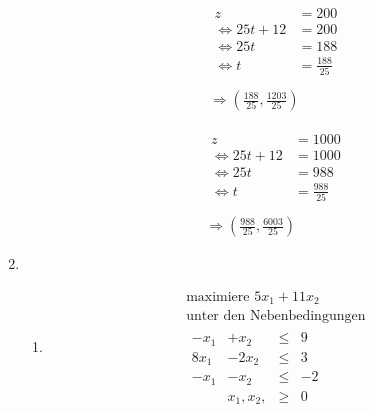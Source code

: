 \documentclass[a4paper]{scrartcl}
\newcommand{\gdw}{\Leftrightarrow}
\begin{document}
\begin{enumerate}
\begin{enumerate}
                \begin{equation}
                    \begin{gathered}
                        \begin{split}
                            z &= 200 \\
                            \gdw 25t + 12 &= 200 \\
                            \gdw 25t &= 188 \\
                            \gdw t &= \frac{188}{25} \\
                        \end{split} \\
                        \Rightarrow \left( \frac{188}{25}, \frac{1203}{25} \right)
                    \end{gathered}
                \end{equation}

                \begin{equation}
                    \begin{gathered}
                        \begin{split}
                            z &= 1000 \\
                            \gdw 25t + 12 &= 1000 \\
                            \gdw 25t &= 988 \\
                            \gdw t &= \frac{988}{25} \\
                        \end{split} \\
                        \Rightarrow \left( \frac{988}{25}, \frac{6003}{25} \right)
                    \end{gathered}
                \end{equation}
                

        \end{enumerate}

    \item %
        \begin{enumerate}
            \item
                \begin{equation}
                    \begin{gathered}
                        \text{maximiere }
                        5x_1 +11x_2 \\
                        \text{unter den Nebenbedingungen} \\
                        \begin{array}{rrcr}
                            -x_1 & +x_2  & \leq & 9 \\
                            8x_1 & -2x_2 & \leq & 3 \\
                            -x_1 & -x_2  & \leq & -2 \\
                            & x_1, x_2, & \geq & 0
                        \end{array}
                    \end{gathered}
                \end{equation}


\end{enumerate}
\end{enumerate}
\end{document}
